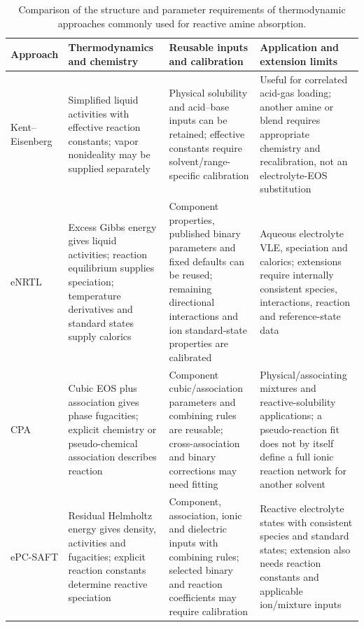 \begin{table}
    \centering
    \small
    \caption{Comparison of the structure and parameter requirements of thermodynamic approaches commonly used for reactive amine absorption.}
    \label{tab:thermodynamic-model-comparison}
    \begin{tabularx}{\textwidth}{>{\raggedright\arraybackslash}p{2.5cm}*{3}{>{\raggedright\arraybackslash}X}}
        \toprule
        \textbf{Approach} & \textbf{Thermodynamics and chemistry} & \textbf{Reusable inputs and calibration} & \textbf{Application and extension limits} \\
        \midrule
        Kent--Eisenberg & Simplified liquid activities with effective reaction constants; vapor nonideality may be supplied separately & Physical solubility and acid--base inputs can be retained; effective constants require solvent/range-specific calibration \cite{Shahid2019,Zhu2022} & Useful for correlated acid-gas loading; another amine or blend requires appropriate chemistry and recalibration, not an electrolyte-EOS substitution \\
        eNRTL & Excess Gibbs energy gives liquid activities; reaction equilibrium supplies speciation; temperature derivatives and standard states supply calorics & Component properties, published binary parameters and fixed defaults can be reused; remaining directional interactions and ion standard-state properties are calibrated \cite{Zhang2011,Akula2023a} & Aqueous electrolyte VLE, speciation and calorics; extensions require internally consistent species, interactions, reaction and reference-state data \\
        CPA & Cubic EOS plus association gives phase fugacities; explicit chemistry or pseudo-chemical association describes reaction & Component cubic/association parameters and combining rules are reusable; cross-association and binary corrections may need fitting \cite{Chen2023} & Physical/associating mixtures and reactive-solubility applications; a pseudo-reaction fit does not by itself define a full ionic reaction network for another solvent \\
        ePC-SAFT & Residual Helmholtz energy gives density, activities and fugacities; explicit reaction constants determine reactive speciation & Component, association, ionic and dielectric inputs with combining rules; selected binary and reaction coefficients may require calibration \cite{Cameretti2005,Bulow2021a} & Reactive electrolyte states with consistent species and standard states; extension also needs reaction constants and applicable ion/mixture inputs \\
        \bottomrule
    \end{tabularx}
\end{table}

